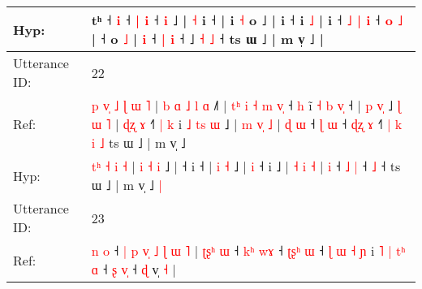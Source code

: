 \documentclass[10pt]{article}
\DeclareRobustCommand{\hl}[1]{{\textcolor{red}{#1}}}
\begin{document}
\begin{longtable}{ll}
 \\
Hyp: & tʰ\hl{}\hl{}\hl{}\hl{}\hl{}\hl{}\hl{}\hl{}\hl{}\hl{}\hl{} ˧\hl{}\hl{}\hl{}\hl{}\hl{}\hl{}\hl{}\hl{}\hl{}\hl{} \hl{i} ˧ \hl{|} \hl{i} ˧\hl{}\hl{}\hl{}\hl{}\hl{} \hl{i} ˩ | \hl{˧} i ˧\hl{}\hl{}\hl{}\hl{}\hl{}\hl{}\hl{} |\hl{}\hl{} i\hl{}\hl{}\hl{}\hl{}\hl{} \hl{}\hl{˧} o ˩ |\hl{}\hl{}\hl{} i\hl{}\hl{}\hl{}\hl{}\hl{}\hl{}\hl{}\hl{}\hl{}\hl{} ˧\hl{}\hl{} i \hl{˩} |\hl{}\hl{}\hl{}\hl{}\hl{}\hl{}\hl{}\hl{}\hl{} i ˧ \hl{˩} \hl{|} \hl{i} ˧\hl{}\hl{} \hl{o} \hl{˩} |\hl{}\hl{}\hl{}\hl{} ˧\hl{}\hl{} o \hl{}\hl{˩} |\hl{}\hl{} \hl{}\hl{i} ˧ \hl{|} \hl{i} ˧\hl{}\hl{}\hl{}\hl{}\hl{} ˩\hl{}\hl{} \hl{˧} \hl{˩} ˧ ts ɯ ˩ | m v̩\hl{}\hl{}\hl{}\hl{}\hl{}\hl{}\hl{}\hl{}\hl{}\hl{}\hl{}\hl{}\hl{}\hl{}\hl{}\hl{}\hl{}\hl{}\hl{}\hl{}\hl{}\hl{}\hl{}\hl{}\hl{}\hl{}\hl{}\hl{}\hl{}\hl{}\hl{}\hl{}\hl{}\hl{}\hl{}\hl{}\hl{}\hl{}\hl{}\hl{}\hl{}\hl{}\hl{}\hl{}\hl{}\hl{}\hl{}\hl{}\hl{}\hl{}\hl{}\hl{}\hl{}\hl{}\hl{}\hl{}\hl{}\hl{}\hl{}\hl{}\hl{}\hl{}\hl{}\hl{} ˩ |
 \\
\midrule
Utterance ID: & 22 \\
Ref: & \hl{p}\hl{ }\hl{v}\hl{̩}\hl{ }\hl{˩} \hl{ɭ} \hl{ɯ} \hl{˥} |\hl{ }\hl{b}\hl{ }\hl{ɑ} \hl{˩} \hl{l} \hl{ɑ} ˩\hl{˥} |\hl{ }\hl{t}\hl{ʰ}\hl{ }\hl{i}\hl{ }\hl{˧}\hl{ }\hl{m}\hl{ }\hl{v}\hl{̩} ˧\hl{ }\hl{h} i\hl{̃}\hl{ }\hl{˧}\hl{ }\hl{b}\hl{ }\hl{v}\hl{̩} ˧ | \hl{p} \hl{v}\hl{̩} ˩\hl{ }\hl{ɭ}\hl{ }\hl{ɯ}\hl{ }\hl{˥} |\hl{ }\hl{ɖ}\hl{ʐ} \hl{ɤ} ˧\hl{˥}\hl{ }\hl{|}\hl{ }\hl{k} i\hl{ }\hl{˩}\hl{ }\hl{t}\hl{s}\hl{ }\hl{ɯ} ˩ | \hl{m} \hl{v}\hl{̩} \hl{˩} |\hl{ }\hl{ɖ} \hl{ɯ} ˧ \hl{ɭ} \hl{ɯ} ˧\hl{ }\hl{ɖ}\hl{ʐ} \hl{ɤ} ˧\hl{˥}\hl{ }\hl{|}\hl{ }\hl{k}\hl{ }\hl{i}\hl{ }\hl{˩} ts ɯ ˩ | m v̩ ˩\hl{}\hl{}
 \\
Hyp: & \hl{}\hl{}\hl{}\hl{}\hl{t}\hl{ʰ} \hl{˧} \hl{i} \hl{˧} |\hl{}\hl{}\hl{}\hl{} \hl{i} \hl{˧} \hl{i} ˩\hl{} |\hl{}\hl{}\hl{}\hl{}\hl{}\hl{}\hl{}\hl{}\hl{}\hl{}\hl{}\hl{} ˧\hl{}\hl{} i\hl{}\hl{}\hl{}\hl{}\hl{}\hl{}\hl{}\hl{} ˧ | \hl{i} \hl{}\hl{˧} ˩\hl{}\hl{}\hl{}\hl{}\hl{}\hl{} |\hl{}\hl{}\hl{} \hl{i} ˧\hl{}\hl{}\hl{}\hl{}\hl{} i\hl{}\hl{}\hl{}\hl{}\hl{}\hl{}\hl{} ˩ | \hl{˧} \hl{}\hl{i} \hl{˧} |\hl{}\hl{} \hl{i} ˧ \hl{˩} \hl{|} ˧\hl{}\hl{}\hl{} \hl{˩} ˧\hl{}\hl{}\hl{}\hl{}\hl{}\hl{}\hl{}\hl{}\hl{} ts ɯ ˩ | m v̩ ˩\hl{ }\hl{|}
 \\
\midrule
Utterance ID: & 23 \\
Ref: & \hl{n}\hl{ }\hl{o} ˧ \hl{|} \hl{p} \hl{v}\hl{̩} \hl{˩} \hl{ɭ} \hl{ɯ} \hl{˥} |\hl{ }\hl{ʈ}\hl{ʂ}\hl{ʰ}\hl{ }\hl{ɯ} ˧\hl{ }\hl{k}\hl{ʰ} \hl{w}\hl{ɤ} ˧\hl{ }\hl{ʈ}\hl{ʂ}\hl{ʰ} \hl{ɯ} ˧\hl{ }\hl{ɭ}\hl{ }\hl{ɯ} \hl{˧} \hl{ɲ} i\hl{ }\hl{˥}\hl{ }\hl{|} \hl{t}\hl{ʰ} \hl{ɑ} ˧\hl{ }\hl{ʂ} \hl{v}\hl{̩} ˧ \hl{ɖ} v̩ \hl{˧} |

\end{longtable}
\end{document}
